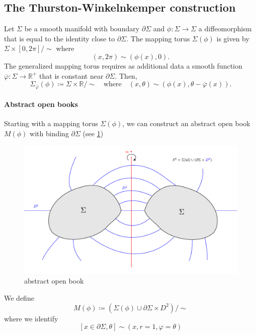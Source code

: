 \subsection*{The Thurston-Winkelnkemper construction}
\begin{definition}
    Let $\Sigma$ be a smooth manifold with boundary $\partial \Sigma$ and $\phi: \Sigma \to \Sigma$ a diffeomorphism that is equal to the identity close to $\partial \Sigma$.
    The mapping torus $\Sigma(\phi)$ is given by
     $\Sigma \times [0,2\pi]/\sim$ where
     \[
        (x, 2\pi) \sim (\phi(x), 0). 
     \]
     The generalized mapping torus requires as additional data a smooth function $\overline{\varphi}: \Sigma \to \mathbb R^+$ that is constant near $\partial \Sigma$. Then,
     \[
        \Sigma_{\overline{\varphi}}(\phi) \coloneqq \Sigma \times \mathbb R/\sim \quad \text{where} \quad  (x, \theta) \sim (\phi(x), \theta - \overline{\varphi}(x)).
     \]
\end{definition}

\paragraph*{Abstract open books}
Starting with a mapping torus $\Sigma(\phi)$, we can construct an abstract open book $M(\phi)$ with binding $\partial \Sigma$ (see \cref{fig:abstract_open_book})
\begin{figure}[ht]
    \includegraphics*[width=\textwidth]{images/abstract_open_book.pdf}
    \caption[abstract open book]{abstract open book}
    \label{fig:abstract_open_book}
\end{figure}

We define
\[
    M(\phi) \coloneqq \left(\Sigma(\phi) \cup \partial \Sigma \times D^2\right)/\sim
\]
where we identify
\[
    [x \in \partial \Sigma, \theta] \sim (x, r=1, \varphi = \theta)  
\]


